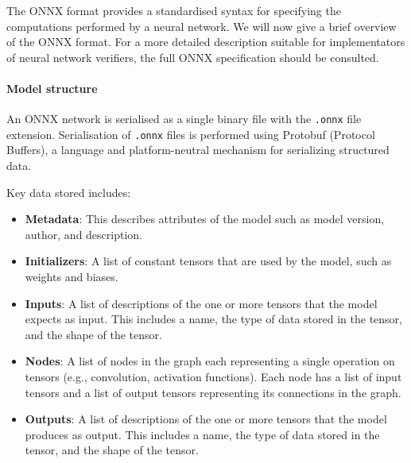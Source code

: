 The ONNX format provides a standardised syntax for specifying the computations performed by a neural network.
We will now give a brief overview of the ONNX format. For a more detailed description suitable for implementators of neural network verifiers, the full ONNX specification should be consulted. 

\paragraph{Model structure} 

An ONNX network is serialised as a single binary file with the \texttt{.onnx} file extension. Serialisation of \texttt{.onnx} files is performed using Protobuf (Protocol Buffers), a language and platform-neutral mechanism for serializing structured data. 

Key data stored includes:
\begin{itemize}
	\item \textbf{Metadata}: This describes attributes of the model such as model version, author, and description.
	\item \textbf{Initializers}: A list of constant tensors that are used by the model, such as weights and biases.
	\item \textbf{Inputs}: A list of descriptions of the one or more tensors that the model expects as input. This includes a name, the type of data stored in the tensor, and the shape of the tensor.
	\item \textbf{Nodes}: A list of nodes in the graph each representing a single operation on  tensors (e.g., convolution, activation functions). Each node has a list of input tensors and a list of output tensors representing its connections in the graph.
	\item \textbf{Outputs}: A list of descriptions of the one or more tensors that the model produces as output. This includes a name, the type of data stored in the tensor, and the shape of the tensor.
\end{itemize}


